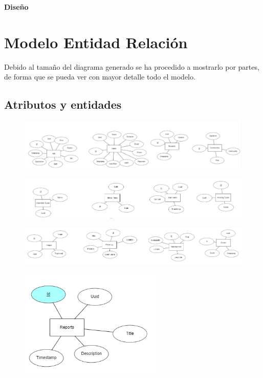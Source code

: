 \newpage{\pagestyle{empty}\cleardoublepage}
\newpage
\vspace*{\fill}
    \begin{center}
      \thispagestyle{empty} \vspace*{0cm} \textbf{\huge
Dise\~{n}o}
    \end{center}
    \vspace*{\fill}
\newpage{\pagestyle{empty}\cleardoublepage}
\chapter{Modelo Entidad Relaci\'{o}n}

Debido al tama\~{n}o del diagrama generado se ha procedido a mostrarlo por partes, de forma que se pueda ver con mayor detalle todo el modelo.

\section{Atributos y entidades}
\begin{figure}[h!]
\centering
\includegraphics[width=1\textwidth]{Img/Disenyo/ER/upohouse_er_attr_1.PNG}
\end{figure}
\begin{figure}[h!]
\centering
\includegraphics[width=1\textwidth]{Img/Disenyo/ER/upohouse_er_attr_2.PNG}
\end{figure}
\begin{figure}[h!]
\centering
\includegraphics[width=1\textwidth]{Img/Disenyo/ER/upohouse_er_attr_3.PNG}
\end{figure}
\begin{figure}[h!]
\centering
\includegraphics[width=.4\textwidth]{Img/Disenyo/ER/upohouse_er_attr_4.PNG}
\label{fig:dcu}
\end{figure}
